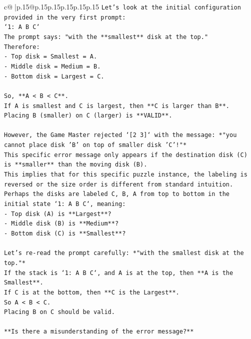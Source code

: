 \documentclass{article}
\begin{document}
{\begin{supertabular}{c@{$\;$}|p{.15\linewidth}@{}p{.15\linewidth}p{.15\linewidth}p{.15\linewidth}p{.15\linewidth}p{.15\linewidth}}
{{{\texttt{Let's look at the initial configuration provided in the very first prompt:} \\
\texttt{`1: A B C`} \\
\texttt{The prompt says: "with the **smallest** disk at the top."} \\
\texttt{Therefore:} \\
\texttt{{-} Top disk = Smallest = A.} \\
\texttt{{-} Middle disk = Medium = B.} \\
\texttt{{-} Bottom disk = Largest = C.} \\
\\ 
\texttt{So, **A < B < C**.} \\
\texttt{If A is smallest and C is largest, then **C is larger than B**.} \\
\texttt{Placing B (smaller) on C (larger) is **VALID**.} \\
\\ 
\texttt{However, the Game Master rejected `{[}2 3{]}` with the message: *"you cannot place disk 'B' on top of smaller disk 'C'!"*} \\
\texttt{This specific error message only appears if the destination disk (C) is **smaller** than the moving disk (B).} \\
\texttt{This implies that for this specific puzzle instance, the labeling is reversed or the size order is different from standard intuition.} \\
\texttt{Perhaps the disks are labeled C, B, A from top to bottom in the initial state `1: A B C`, meaning:} \\
\texttt{{-} Top disk (A) is **Largest**?} \\
\texttt{{-} Middle disk (B) is **Medium**?} \\
\texttt{{-} Bottom disk (C) is **Smallest**?} \\
\\ 
\texttt{Let's re{-}read the prompt carefully: *"with the smallest disk at the top."*} \\
\texttt{If the stack is `1: A B C`, and A is at the top, then **A is the Smallest**.} \\
\texttt{If C is at the bottom, then **C is the Largest**.} \\
\texttt{So A < B < C.} \\
\texttt{Placing B on C should be valid.} \\
\\ 
\texttt{**Is there a misunderstanding of the error message?**} \\
}}}
\end{supertabular}}
\end{document}
